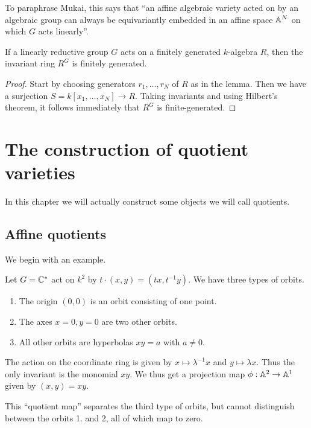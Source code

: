 \documentclass[11pt, english]{article}
\begin{document}
To paraphrase Mukai, this says that ``an affine algebraic variety acted on by an algebraic group can always be equivariantly embedded in an affine space $\mathbb{A}^N$ on which $G$ acts linearly''.

\begin{thm}
If a linearly reductive group $G$ acts on a finitely generated $k$-algebra $R$, then the invariant ring $R^G$ is finitely generated.
\end{thm}
\begin{proof}
Start by choosing generators $r_1,\ldots,r_N$ of $R$ as in the lemma. Then we have a surjection $S=k[x_1,\ldots,x_N] \to R$. Taking invariants and using Hilbert's theorem, it follows immediately that $R^G$ is finite-generated.
\end{proof}

\section{The construction of quotient varieties}

In this chapter we will actually construct some objects we will call quotients.

\subsection{Affine quotients}

We begin with an example.
\begin{example}
Let $G = \mathbb{C}^\ast$ act on $k^2$ by $t \cdot (x,y) = (tx,t^{-1} y)$. We have three types of orbits.
\begin{enumerate}
\item The origin $(0,0)$ is an orbit consisting of one point.
\item The axes $x=0,y=0$ are two other orbits.
\item All other orbits are hyperbolas $xy=a$ with $a \neq 0$.
\end{enumerate}
The action on the coordinate ring is given by $x \mapsto \lambda^{-1}x$ and $y \mapsto \lambda x$. Thus the only invariant is the monomial $xy$. We thus get a projection map $\phi:\mathbb{A}^2 \to \mathbb{A}^1$ given by $(x,y)=xy$.

This ``quotient map'' separates the third type of orbits, but cannot distinguish between the orbits 1. and 2, all of which map to zero.
\end{example}
\end{document}
